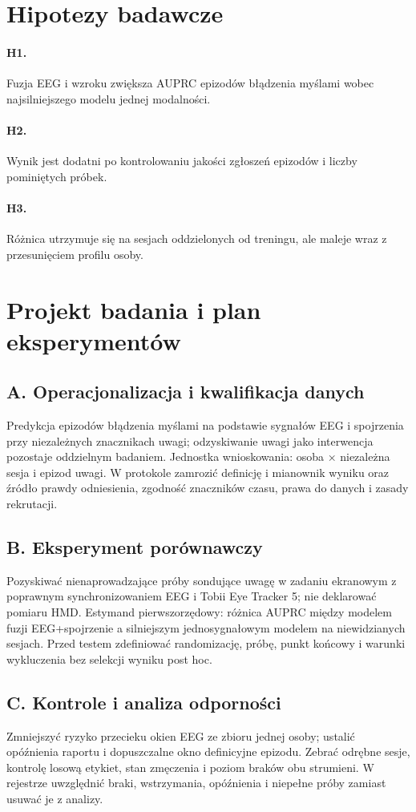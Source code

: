 \documentclass[11pt,a4paper]{article}
\begin{document}
\section{Hipotezy badawcze}
\paragraph{H1.} Fuzja EEG i wzroku zwiększa AUPRC epizodów błądzenia myślami wobec najsilniejszego modelu jednej modalności.
\paragraph{H2.} Wynik jest dodatni po kontrolowaniu jakości zgłoszeń epizodów i liczby pominiętych próbek.
\paragraph{H3.} Różnica utrzymuje się na sesjach oddzielonych od treningu, ale maleje wraz z przesunięciem profilu osoby.
\section{Projekt badania i plan eksperymentów}
\subsection{A. Operacjonalizacja i kwalifikacja danych}
Predykcja epizodów błądzenia myślami na podstawie sygnałów EEG i spojrzenia przy niezależnych znacznikach uwagi; odzyskiwanie uwagi jako interwencja pozostaje oddzielnym badaniem. Jednostka wnioskowania: osoba × niezależna sesja i epizod uwagi. W protokole zamrozić definicję i mianownik wyniku oraz źródło prawdy odniesienia, zgodność znaczników czasu, prawa do danych i zasady rekrutacji.
\subsection{B. Eksperyment porównawczy}
Pozyskiwać nienaprowadzające próby sondujące uwagę w zadaniu ekranowym z poprawnym synchronizowaniem EEG i Tobii Eye Tracker 5; nie deklarować pomiaru HMD. Estymand pierwszorzędowy: różnica AUPRC między modelem fuzji EEG+spojrzenie a silniejszym jednosygnałowym modelem na niewidzianych sesjach. Przed testem zdefiniować randomizację, próbę, punkt końcowy i warunki wykluczenia bez selekcji wyniku post hoc.
\subsection{C. Kontrole i analiza odporności}
Zmniejszyć ryzyko przecieku okien EEG ze zbioru jednej osoby; ustalić opóźnienia raportu i dopuszczalne okno definicyjne epizodu. Zebrać odrębne sesje, kontrolę losową etykiet, stan zmęczenia i poziom braków obu strumieni. W rejestrze uwzględnić braki, wstrzymania, opóźnienia i niepełne próby zamiast usuwać je z analizy.
\end{document}
